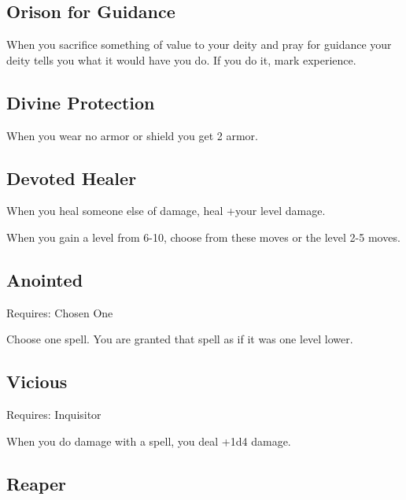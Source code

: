 \subsection{Orison for Guidance}    
 

When you sacrifice something of value to your deity and pray for guidance your deity tells you what it would have you do. If you do it, mark experience.

 
\subsection{Divine Protection}    
 

When you wear no armor or shield you get 2 armor.

 
\subsection{Devoted Healer}    
 

When you heal someone else of damage, heal +your level damage.

 
\startInstructions
When you gain a level from 6-10, choose from these moves or the level 2-5 moves.
\stopInstructions
 
\subsection{Anointed}   
 

Requires: Chosen One

 

Choose one spell. You are granted that spell as if it was one level lower.

 
\subsection{Vicious}   
 

Requires: Inquisitor

 

When you do damage with a spell, you deal +1d4 damage.

 
\subsection{Reaper}   
 

